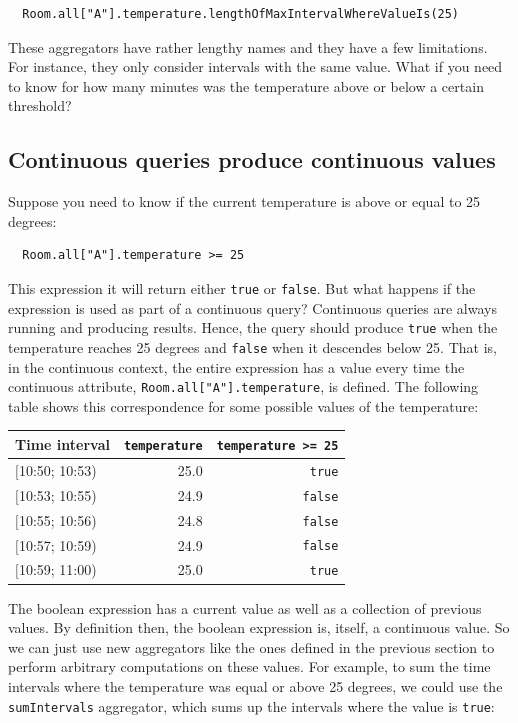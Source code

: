\documentclass{report}
\begin{document}
\begin{lstlisting}
  Room.all["A"].temperature.lengthOfMaxIntervalWhereValueIs(25)
\end{lstlisting}

These aggregators have rather lengthy names and they have a few
limitations. For instance, they only consider intervals with the same
value. What if you need to know for how many minutes was the
temperature above or below a certain threshold?

\subsection{Continuous queries produce continuous values}

Suppose you need to know if the current temperature is above or equal
to 25 degrees:

\begin{lstlisting}
  Room.all["A"].temperature >= 25
\end{lstlisting}

This expression it will return either \verb=true= or \verb=false=. But
what happens if the expression is used as part of a continuous query?
Continuous queries are always running and producing results. Hence,
the query should produce \verb=true= when the temperature reaches 25
degrees and \verb=false= when it descendes below 25. That is, in the
continuous context, the entire expression has a value every time the
continuous attribute, \verb=Room.all["A"].temperature=, is
defined. The following table shows this correspondence for some
possible values of the temperature:

\begin{tabular}{ |l|r|r| }
  \hline
  Time interval & \verb=temperature= & \verb!temperature >= 25! \\
  \hline
  $[$10:50; 10:53) & 25.0 & \verb=true=  \\
  $[$10:53; 10:55) & 24.9 & \verb=false= \\
  $[$10:55; 10:56) & 24.8 & \verb=false= \\
  $[$10:57; 10:59) & 24.9 & \verb=false= \\
  $[$10:59; 11:00) & 25.0 & \verb=true=  \\
  \hline
\end{tabular}

The boolean expression has a current value as well as a collection of
previous values. By definition then, the boolean expression is,
itself, a continuous value. So we can just use new aggregators like
the ones defined in the previous section to perform arbitrary
computations on these values. For example, to sum the time intervals
where the temperature was equal or above 25 degrees, we could use the
\verb=sumIntervals= aggregator, which sums up the intervals where the
value is \verb=true=:
\end{document}
